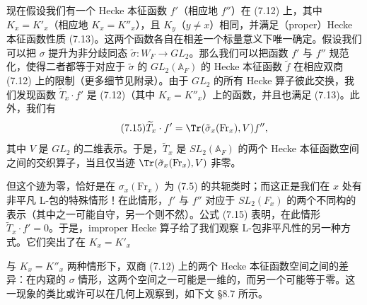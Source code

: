 现在假设我们有一个 Hecke 本征函数 $f'$（相应地 $f''$）在 (7.12) 上，其中 $K_x=K'_x$（相应地 $K_x=K''_x$），且 $K_y$（$y\neq x$）相同，并满足（proper）Hecke 本征函数性质 (7.13)。这两个函数各自在相差一个标量意义下唯一确定。假设我们可以把 $\sigma$ 提升为非分歧同态 $\tilde\sigma: W_F\to GL_2$。那么我们可以把函数 $f'$ 与 $f''$ 规范化，使得二者都等于对应于 $\tilde\sigma$ 的 $GL_2(\mathbb{A}_F)$ 的 Hecke 本征函数 $\tilde f$ 在相应双商 (7.12) 上的限制（更多细节见附录）。由于 $GL_2$ 的所有 Hecke 算子彼此交换，我们发现函数 $\widetilde{T}_x\cdot f'$ 是 (7.12)（其中 $K_x=K''_x$）上的函数，并且也满足 (7.13)。此外，我们有
\begin{equation}\tag{7.15}
\widetilde{T}_x\cdot f' = \Tr(\tilde\sigma_x(\mathrm{Fr}_x),V)f'',
\end{equation}
其中 $V$ 是 $GL_2$ 的二维表示。于是，$\widetilde{T}_x$ 是 $SL_2(\mathbb{A}_F)$ 的两个 Hecke 本征函数空间之间的交织算子，当且仅当迹 $\Tr(\tilde\sigma_x(\mathrm{Fr}_x),V)$ 非零。

但这个迹为零，恰好是在 $\sigma_x(\mathrm{Fr}_x)$ 为 (7.5) 的共轭类时；而这正是我们在 $x$ 处有非平凡 L-包的特殊情形！在此情形，$f'$ 与 $f''$ 对应于 $SL_2(F_x)$ 的两个不同构的表示（其中之一可能自守，另一个则不然）。公式 (7.15) 表明，在此情形 $\widetilde{T}_x\cdot f'=0$。于是，improper Hecke 算子给了我们观察 L-包非平凡性的另一种方式。它们突出了在 $K_x=K'_x$


与 $K_x=K''_x$ 两种情形下，双商 (7.12) 上的两个 Hecke 本征函数空间之间的差异：在内窥的 $\sigma$ 情形，这两个空间之一可能是一维的，而另一个可能等于零。这一现象的类比或许可以在几何上观察到，如下文 §8.7 所示。
